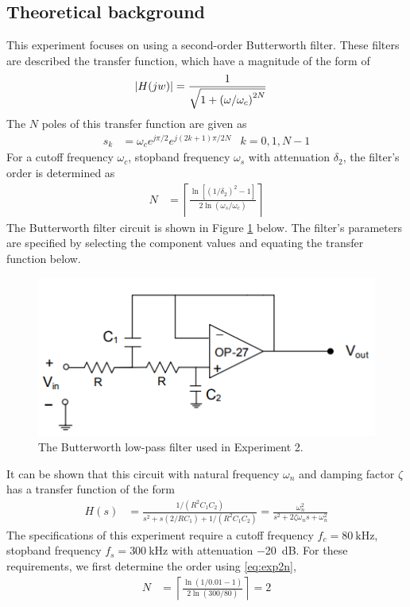 \documentclass{report}
\begin{document}
\subsection{Theoretical background}
This experiment focuses on using a second-order Butterworth filter. These filters are described the transfer function, which have a magnitude of the form of \begin{align}
	\abs{H(jw)} & = \frac{1}{\sqrt{1 + \left(\omega / \omega_c\right)^{2N}}} \label{eq:exp2magnitude}
\end{align}
The $N$ poles of this transfer function are given as \begin{align}
	s_k & = \omega_c e^{j \pi / 2} e^{j\left(2k + 1\right)\pi / 2N} & k = 0, 1, N - 1 \label{eq:exp2poles}
\end{align}
For a cutoff frequency $\omega_c$, stopband frequency $\omega_s$ with attenuation $\delta_2$, the filter's order is determined as \begin{align}
	N & = \left\lceil \frac{\ln[(1 / \delta_2)^2 - 1]}{2\ln(\omega_s / \omega_c)} \right\rceil \label{eq:exp2n}
\end{align}
The Butterworth filter circuit is shown in Figure \ref{fig:exp2ckt} below. The filter's parameters are specified by selecting the component values and equating the transfer function below.
\begin{figure}[H]
	\centering
	\includegraphics[width=0.4\linewidth]{exp2_ckt}
	\caption{The Butterworth low-pass filter used in Experiment 2.}
	\label{fig:exp2ckt}
\end{figure}
\noindent It can be shown that this circuit with natural frequency $\omega_n$ and damping factor $\zeta$ has a transfer function of the form \begin{align}
	H(s) & = \frac{1 / \left( R^2 C_1 C_2\right)}{s^2 + s \left(2/RC_1\right) + 1 / \left(R^2 C_1 C_2\right)} = \frac{\omega_n^2}{s^2 + 2 \zeta \omega_n s + \omega_n^2} \label{eq:exp2h}
\end{align}
The specifications of this experiment require a cutoff frequency $f_c = \SI{80}{\kHz}$, stopband frequency $f_s = \SI{300}{\kHz}$ with attenuation \SI{-20}{\dB}. For these requirements, we first determine the order using \eqref{eq:exp2n}, \begin{align*}
	N & = \left\lceil \frac{\ln(1/0.01 - 1)}{2 \ln(300/80)} \right\rceil = 2
\end{align*}
\end{document}
